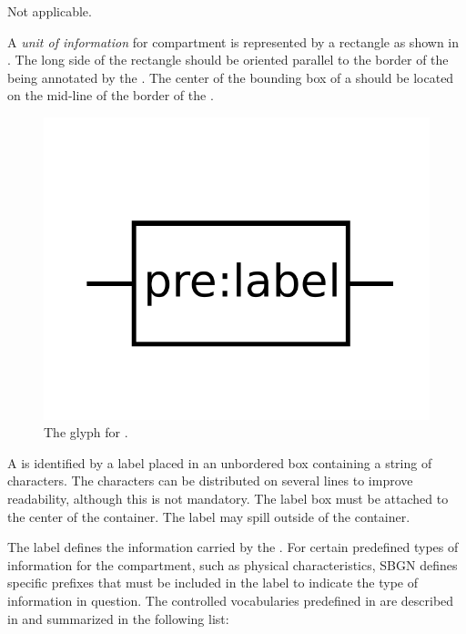 \begin{glyphDescription}

\glyphSboTerm Not applicable.

\glyphContainer A \emph{unit of information} for compartment is represented by a rectangle as shown in .  The long side of the rectangle should be oriented parallel to the border of the  being annotated by the . The center of the bounding box of a  should be located on the mid-line of the border of the .

\begin{figure}[H]
  \centering
  \includegraphics[scale = 0.5]{images/build/unitInformation.pdf}
  \caption{The \AF glyph for .}
  \label{fig:compunitInfo}
\end{figure}

\glyphLabel A  is identified by a label placed in an unbordered box containing a string of characters.  The characters can be distributed on several lines to improve readability, although this is not mandatory.  The label box must be attached to the center of the container.  The label may spill outside of the container.

The label defines the information carried by the .  For certain predefined types of information for the compartment, such as physical characteristics, SBGN defines specific prefixes that must be included in the label to indicate the type of information in question.  The controlled vocabularies predefined in \SBGNAFLone are described in  and summarized in the following list:


\end{glyphDescription}

